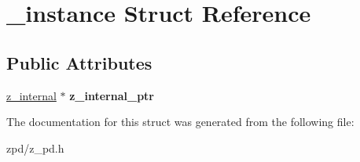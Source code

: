 \hypertarget{struct__instance}{\section{\-\_\-instance Struct Reference}
\label{struct__instance}
}
\subsection*{Public Attributes}
\begin{DoxyCompactItemize}
\item 
\hypertarget{struct__instance_a31a25c5b59bebeb4110289307dbc113d}{\hyperlink{struct__internal}{z\-\_\-internal} $\ast$ {\bfseries z\-\_\-internal\-\_\-ptr}}\label{struct__instance_a31a25c5b59bebeb4110289307dbc113d}

\end{DoxyCompactItemize}


The documentation for this struct was generated from the following file\-:\begin{DoxyCompactItemize}
\item 
zpd/z\-\_\-pd.\-h\end{DoxyCompactItemize}
